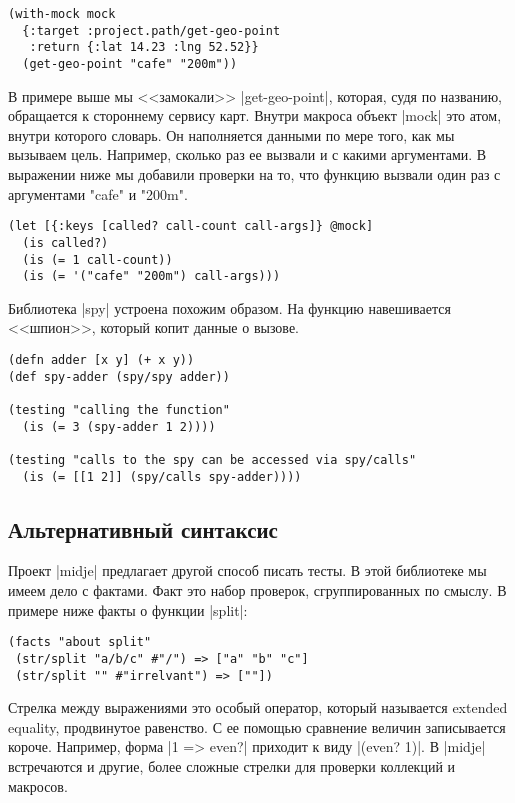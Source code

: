 \begin{verbatim}
(with-mock mock
  {:target :project.path/get-geo-point
   :return {:lat 14.23 :lng 52.52}}
  (get-geo-point "cafe" "200m"))
\end{verbatim}

В примере выше мы <<замокали>> \spverb|get-geo-point|, которая, судя по названию,
обращается к стороннему сервису карт. Внутри макроса объект \spverb|mock| это атом,
внутри которого словарь. Он наполняется данными по мере того, как мы вызываем
цель. Например, сколько раз ее вызвали и с какими аргументами. В выражении ниже
мы добавили проверки на то, что функцию вызвали один раз с аргументами "cafe" и
"200m".

\begin{verbatim}
(let [{:keys [called? call-count call-args]} @mock]
  (is called?)
  (is (= 1 call-count))
  (is (= '("cafe" "200m") call-args)))
\end{verbatim}

Библиотека \spverb|spy| устроена похожим образом. На функцию навешивается <<шпион>>,
который копит данные о вызове.

\begin{verbatim}
(defn adder [x y] (+ x y))
(def spy-adder (spy/spy adder))

(testing "calling the function"
  (is (= 3 (spy-adder 1 2))))

(testing "calls to the spy can be accessed via spy/calls"
  (is (= [[1 2]] (spy/calls spy-adder))))
\end{verbatim}

\subsection{Альтернативный синтаксис}

Проект \spverb|midje| предлагает другой способ писать тесты. В этой библиотеке мы имеем
дело с фактами. Факт это набор проверок, сгруппированных по смыслу. В примере
ниже факты о функции \spverb|split|:

\begin{verbatim}
(facts "about split"
 (str/split "a/b/c" #"/") => ["a" "b" "c"]
 (str/split "" #"irrelvant") => [""])
\end{verbatim}

Стрелка между выражениями это особый оператор, который называется extended
equality, продвинутое равенство. С ее помощью сравнение величин записывается
короче. Например, форма \spverb|1 => even?| приходит к виду \spverb|(even? 1)|.
В \spverb|midje| встречаются и другие, более сложные стрелки для проверки коллекций и макросов.

